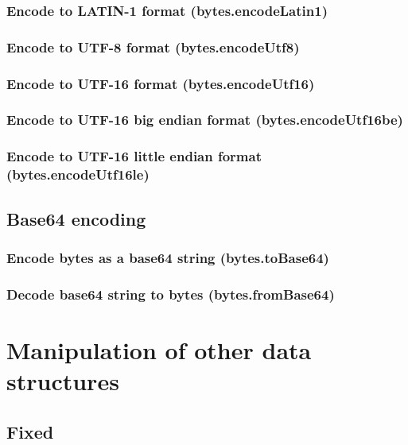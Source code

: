 \documentclass{article}
\theoremstyle{definition}
\begin{document}
\subsubsection{Encode to LATIN-1 format (bytes.encodeLatin1)}

\subsubsection{Encode to UTF-8 format (bytes.encodeUtf8)}

\subsubsection{Encode to UTF-16 format (bytes.encodeUtf16)}

\subsubsection{Encode to UTF-16 big endian format (bytes.encodeUtf16be)}

\subsubsection{Encode to UTF-16 little endian format (bytes.encodeUtf16le)}

\subsection{Base64 encoding}

\subsubsection{Encode bytes as a base64 string (bytes.toBase64)}

\subsubsection{Decode base64 string to bytes (bytes.fromBase64)}

\pagebreak
\section{Manipulation of other data structures}

\subsection{Fixed}
\end{document}
